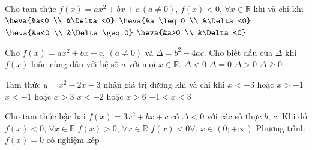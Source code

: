 

\begin{ex}%
	Cho tam thức $f(x)=a x^2+bx+c  ~(a \neq 0)$, $f(x)<0$, $\forall x \in \mathbb{R}$ khi và chỉ khi
	 \choice
		{\True $\heva{&a<0 \\  &\Delta<0}$}
		{$\heva{&a \leq 0  \\ &\Delta<0}$}
		{$\heva{&a<0  \\ &\Delta \geq 0}$}
		{$\heva{&a>0  \\ &\Delta<0}$}
\end{ex}

\begin{ex}%
	Cho $f(x)=a x^2+b x+c$, $(a  \neq 0)$ và $\Delta=b^2-4a c$. Cho biết dấu của $\Delta$ khi $f(x)$ luôn cùng dấu với hệ số $a$ với mọi $x \in \mathbb{R}$.
	 \choice
		 {\True $\Delta < 0$}
		 {$\Delta=0$}
		{$\Delta >  0$}
		{$\Delta \geq  0$}
\end{ex}

\begin{ex}%
	Tam thức $y=x^2-2x-3$ nhận giá  trị dương khi và chỉ khi
	\choice 
		{$x<-3$ hoặc $x>-1$} 
		{\True  $x<-1$ hoặc $x>3$}
		 {$x<-2$ hoặc $x>6$}
		{$-1<x<3$} 
\end{ex}

\begin{ex}%
	Cho tam thức bậc hai $f(x)=3x^{2}+bx+c$  có $\Delta<0$ với các số thực $b$, $c$. Khi đó
	\choice 
		{$f(x)<0$, $\forall  x\in \mathbb{R}$}
		{\True $f(x)>0$,  $\forall x\in \mathbb{R}$}
		{$f(x)<0\forall$, $x\in(0;+\infty)$} 
		{Phương  trình $f(x)=0$ có nghiệm kép}
\end{ex}

